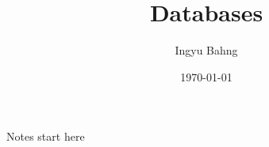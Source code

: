 \documentclass[10pt]{article}
\title{Databases}
\date{\today}
\author{Ingyu Bahng}
\begin{document}


Notes start here
  
\end{document}

